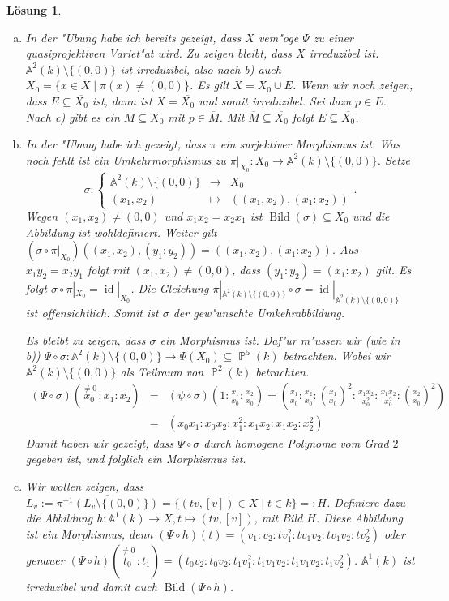 \documentclass[a4paper, 12pt, numbers=noendperiod, chapterprefix=true]{scrbook}
\theoremstyle{break}
\newtheorem{Loes}{L\"osung}
\theoremstyle{nonumberbreak}
\theoremstyle{nonumberplain}
\newcommand{\set}[2]{\{#1\mid #2\}} %
\DeclareMathOperator{\Bild}{Bild}
\DeclareMathOperator{\id}{id}
\newcommand{\A}{\mathbb{A}}
\newcommand{\Affine}{\mathbb{A}} %
\DeclareMathOperator{\Projective}{\mathbb{P}} %
\begin{document}
\begin{Loes}\begin{enumerate}[a)]
\item
	In der "Ubung habe ich bereits gezeigt, dass $X$ vem"oge $\Psi$ zu einer quasiprojektiven Variet"at wird. Zu zeigen bleibt, dass $X$ irreduzibel ist. $\Affine^2(k) \setminus \{(0,0)\}$ ist irreduzibel, also nach b) auch $X_0= \set{x\in X}{\pi(x)\neq (0,0)}$. Es gilt $X = X_0 \cup E$. Wenn wir noch zeigen, dass $E \subseteq \overline{X_0}$ ist, dann ist $X = \overline{X_0}$ und somit irreduzibel. Sei dazu $p \in E$. Nach c) gibt es ein $M \subseteq X_0$ mit $p \in \overline{M}$. Mit $\overline{M} \subseteq \overline{X_0}$ folgt $E \subseteq \overline{X_0}$.
\item
	In der "Ubung habe ich gezeigt, dass $\pi$ ein surjektiver Morphismus ist. Was noch fehlt ist ein Umkehrmorphismus zu $\pi|_{X_0}: X_0 \to \Affine^2(k) \setminus\{(0,0)\}$. Setze
		\[\sigma: \left\{ \begin{array}{ccl}
			\Affine^2(k) \setminus\{(0,0)\} &\to& X_0\\
			(x_1,x_2) & \mapsto & ((x_1,x_2),(x_1:x_2))
		\end{array}\right. .\]
	Wegen $(x_1, x_2) \neq (0,0)$ und $x_1 x_2 = x_2 x_1$ ist $\Bild(\sigma) \subseteq X_0$ und die Abbildung ist wohldefiniert. Weiter gilt $(\sigma \circ \pi|_{X_0}) ((x_1,x_2),(y_1:y_2)) = ((x_1,x_2),(x_1:x_2))$. Aus $x_1 y_2 = x_2 y_1$ folgt mit $(x_1, x_2) \neq (0,0)$, dass $(y_1:y_2) = (x_1:x_2)$ gilt. Es folgt $\sigma \circ \pi|_{X_0} = \id|_{X_0}$. Die Gleichung $\pi|_{\Affine^2(k) \setminus\{(0,0)\}} \circ \sigma = \id|_{\Affine^2(k) \setminus\{(0,0)\}}$ ist offensichtlich. Somit ist $\sigma$ der gew"unschte Umkehrabbildung.
	
	Es bleibt zu zeigen, dass $\sigma$ ein Morphismus ist. Daf"ur m"ussen wir (wie in b)) $\Psi \circ \sigma \colon \Affine^2(k) \setminus \{(0,0)\} \to \Psi(X_0) \subseteq \Projective^5(k)$ betrachten. Wobei wir $\Affine^2(k) \setminus\{(0,0)\}$ als Teilraum von $\Projective^2(k)$ betrachten.
	\begin{eqnarray*}
		(\Psi \circ \sigma)(\stackrel{\neq 0}{x_0}\,:x_1:x_2) 
		&=& (\psi\circ \sigma)\left(1:\frac{x_1}{x_0}:\frac{x_2}{x_0}\right) 
		= \left(\frac{x_1}{x_0}: \frac{x_2}{x_0}:\left(\frac{x_1}{x_0}\right)^2: \frac{x_1 x_2}{x_0^2}: \frac{x_1 x_2}{x_0^2}: \left(\frac{x_2}{x_0}\right)^2\right)\\
		&=& (x_0x_1:x_0x_2:x_1^2:x_1x_2:x_1x_2:x_2^2)
	\end{eqnarray*}
	Damit haben wir gezeigt, dass $\Psi \circ \sigma$ durch homogene Polynome vom Grad $2$ gegeben ist, und folglich ein Morphismus ist.
\item
	Wir wollen zeigen, dass $\widetilde{L_v} := \overline{\pi^{-1}(L_v \setminus\{(0,0)\})} = \{(tv,[v]) \in X \mid t \in k\} =: H$. Definiere dazu die Abbildung $h\colon \Affine^1(k) \to X, t \mapsto (tv,[v])$, mit Bild $H$. Diese Abbildung ist ein Morphismus, denn $(\Psi \circ h)(t) = (v_1:v_2:tv_1^2:tv_1v_2:tv_1v_2:tv_2^2)$ oder genauer $(\Psi \circ h)(\stackrel{\neq 0}{t_0}\,:t_1) = (t_0v_2:t_0v_2:t_1v_1^2:t_1v_1v_2:t_1v_1v_2:t_1v_2^2)$. $\Affine^1(k)$ ist irreduzibel und damit auch $\Bild(\Psi \circ h)$.


\end{enumerate}
\end{Loes}
\end{document}
